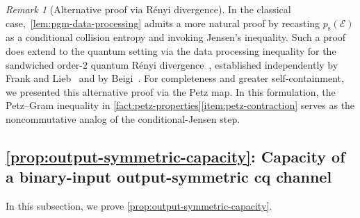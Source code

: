 \documentclass[11pt]{article}
\theoremstyle{remark}
\newtheorem{remark}{Remark}[section]
\newcommand{\cE}{\mathcal{E}}
\begin{document}
\begin{remark}[Alternative proof via R\'enyi divergence]
\label{rem:pgm-data-processing-alt-proof}
In the classical case,~\cref{lem:pgm-data-processing} admits a more natural proof by recasting $p_{\mathrm{s}}(\cE)$ as a conditional collision entropy and invoking Jensen's inequality. Such a proof does extend to the quantum setting via the data processing inequality for the sandwiched order-$2$ quantum R\'enyi divergence~\cite{MLDSFT13,WWY14}, established independently by Frank and Lieb~\cite{FL13} and by Beigi~\cite{Bei13}. For completeness and greater self-containment, we presented this alternative proof via the Petz map. In this formulation, the Petz--Gram inequality in \cref{fact:petz-properties}\ref{item:petz-contraction} serves as the noncommutative analog of the conditional-Jensen step.
\end{remark}

\subsection{\texorpdfstring{\cref{prop:output-symmetric-capacity}}{Proposition }: Capacity of a binary-input output-symmetric cq channel}
\label{appsubsec:proof-output-symmetric-capacity}

In this subsection, we prove \cref{prop:output-symmetric-capacity}.
\end{document}
